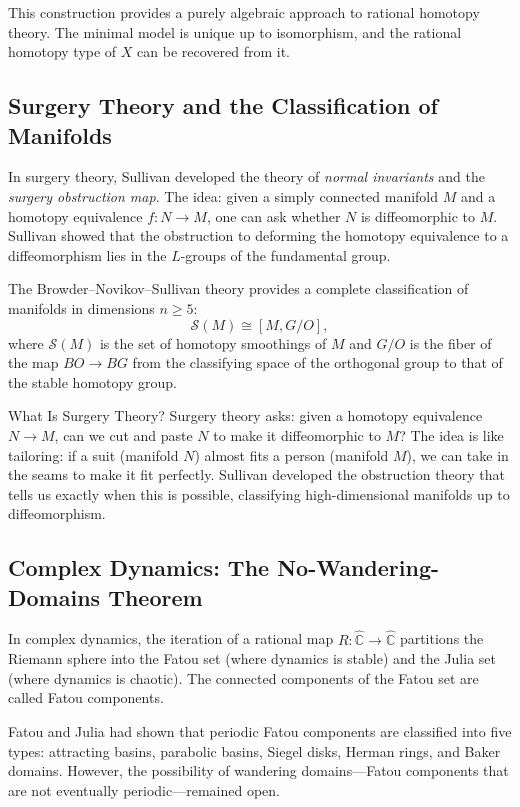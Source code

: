 This construction provides a purely algebraic approach to rational homotopy theory. The minimal model is unique up to isomorphism, and the rational homotopy type of $X$ can be recovered from it.

\subsection{Surgery Theory and the Classification of Manifolds}

In surgery theory, Sullivan developed the theory of \emph{normal invariants} and the \emph{surgery obstruction map}. The idea: given a simply connected manifold $M$ and a homotopy equivalence $f: N \to M$, one can ask whether $N$ is diffeomorphic to $M$. Sullivan showed that the obstruction to deforming the homotopy equivalence to a diffeomorphism lies in the $L$-groups of the fundamental group.

The Browder--Novikov--Sullivan theory provides a complete classification of manifolds in dimensions $n \geq 5$:
\[
\mathcal{S}(M) \cong [M, G/O],
\]
where $\mathcal{S}(M)$ is the set of homotopy smoothings of $M$ and $G/O$ is the fiber of the map $BO \to BG$ from the classifying space of the orthogonal group to that of the stable homotopy group.

\begin{primer}{What Is Surgery Theory?}
Surgery theory asks: given a homotopy equivalence $N \to M$, can we cut and paste $N$ to make it diffeomorphic to $M$? The idea is like tailoring: if a suit (manifold $N$) almost fits a person (manifold $M$), we can take in the seams to make it fit perfectly. Sullivan developed the obstruction theory that tells us exactly when this is possible, classifying high-dimensional manifolds up to diffeomorphism.
\end{primer}

\subsection{Complex Dynamics: The No-Wandering-Domains Theorem}

In complex dynamics, the iteration of a rational map $R: \widehat{\mathbb{C}} \to \widehat{\mathbb{C}}$ partitions the Riemann sphere into the Fatou set (where dynamics is stable) and the Julia set (where dynamics is chaotic). The connected components of the Fatou set are called Fatou components.

Fatou and Julia had shown that periodic Fatou components are classified into five types: attracting basins, parabolic basins, Siegel disks, Herman rings, and Baker domains. However, the possibility of wandering domains---Fatou components that are not eventually periodic---remained open.

